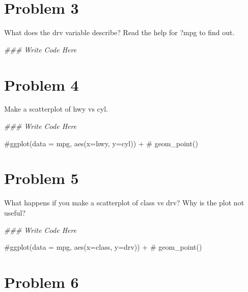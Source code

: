 \documentclass[
  letterpaper,
  DIV=11,
  numbers=noendperiod]{scrreprt}
\newenvironment{Shaded}{\begin{snugshade}}{\end{snugshade}}
\newcommand{\CommentTok}[1]{\textcolor[rgb]{0.37,0.37,0.37}{#1}}
\newcommand{\DocumentationTok}[1]{\textcolor[rgb]{0.37,0.37,0.37}{\textit{#1}}}
\begin{document}
\section*{Problem 3}\label{problem-3-1}


What does the drv variable describe? Read the help for ?mpg to find out.

\begin{Shaded}
\begin{Highlighting}[]
\DocumentationTok{\#\#\# Write Code Here}
\end{Highlighting}
\end{Shaded}

\section*{Problem 4}\label{problem-4-1}


Make a scatterplot of hwy vs cyl.

\begin{Shaded}
\begin{Highlighting}[]
\DocumentationTok{\#\#\# Write Code Here}

\CommentTok{\#ggplot(data = mpg, aes(x=hwy, y=cyl)) +}
\CommentTok{\#  geom\_point()}
\end{Highlighting}
\end{Shaded}

\section*{Problem 5}\label{problem-5-1}


What happens if you make a scatterplot of class vs drv? Why is the plot
not useful?

\begin{Shaded}
\begin{Highlighting}[]
\DocumentationTok{\#\#\# Write Code Here}

\CommentTok{\#ggplot(data = mpg, aes(x=class, y=drv)) +}
\CommentTok{\#  geom\_point()}
\end{Highlighting}
\end{Shaded}

\section*{Problem 6}\label{problem-6-1}
\end{document}
